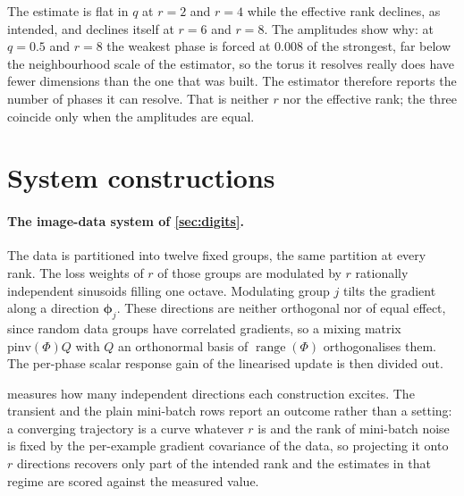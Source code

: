\documentclass[twoside]{article}
\newcommand{\vphi}{{\bm{\phi}}}
\begin{document}
The estimate is flat in $q$ at $r = 2$ and $r = 4$ while the effective rank declines, as intended,
and declines itself at $r = 6$ and $r = 8$. The amplitudes show why: at $q = 0.5$ and
$r = 8$ the weakest phase is
forced at $0.008$ of the strongest, far below the neighbourhood scale
of the estimator, so the torus it resolves really does have fewer dimensions than the one that was
built. The estimator therefore reports the number of phases it can resolve. That is neither $r$ nor
the effective rank; the three coincide only when the amplitudes are equal.

\section{System constructions}\label{app:constructions}

\paragraph{The image-data system of \cref{sec:digits}.} The data is partitioned into twelve fixed
groups, the same partition at every rank. The
loss weights of $r$ of those groups are modulated by $r$ rationally independent sinusoids filling
one octave. Modulating group $j$ tilts the gradient along a direction $\vphi_j$. These
directions are neither orthogonal nor of equal effect, since random data groups have correlated
gradients, so a mixing matrix $\mathrm{pinv}(\Phi) Q$ with $Q$ an orthonormal basis of
$\operatorname{range}(\Phi)$ orthogonalises them. The per-phase scalar response gain of the
linearised update is then divided out.

 measures how many independent directions each construction excites. The transient and the plain mini-batch rows report an outcome rather than a setting: a
converging trajectory is a curve whatever $r$ is and the rank of mini-batch noise is fixed by the
per-example gradient covariance of the data, so projecting it onto $r$ directions recovers only
part of the intended rank and the estimates in that regime are scored against the measured
value.
\end{document}
